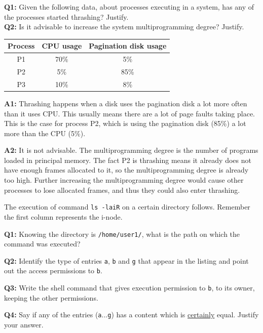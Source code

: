 \documentclass{sope}
\begin{document}

\textbf{Q1:} Given the following data, about processes executing in a system, has any of the processes started thrashing? Justify.\\
\textbf{Q2:} Is it advisable to increase the system multiprogramming degree? Justify.

\begin{center}
    \begin{tabular}{c | c | c}
        Process & CPU usage & Pagination disk usage \\ \hline
        P1 & 70\% &  5\% \\
        P2 &  5\% & 85\% \\
        P3 & 10\% &  8\%
    \end{tabular}
\end{center}

\ansseparator

\textbf{A1:} Thrashing happens when a disk uses the pagination disk a lot more often than it uses CPU. This usually means there are a lot of page faults taking place. This is the case for process P2, which is using the pagination disk (85\%) a lot more than the CPU (5\%).

\textbf{A2:} It is not advisable. The multiprogramming degree is the number of programs loaded in principal memory. The fact P2 is thrashing means it already does not have enough frames allocated to it, so the multiprogramming degree is already too high. Further increasing the multiprogramming degree would cause other processes to lose allocated frames, and thus they could also enter thrashing.

The execution of command \texttt{ls -laiR} on a certain directory follows. Remember the first column represents the i-node.

\textbf{Q1:} Knowing the directory is \texttt{/home/user1/}, what is the path on which the command was executed?

\textbf{Q2:} Identify the type of entries \texttt{a}, \texttt{b} and \texttt{g} that appear in the listing and point out the access permissions to \texttt{b}.

\textbf{Q3:} Write the shell command that gives execution permission to \texttt{b}, to its owner, keeping the other permissions.

\textbf{Q4:} Say if any of the entries (\texttt{a}...\texttt{g}) has a content which is \underline{certainly} equal. Justify your answer.
\end{document}
